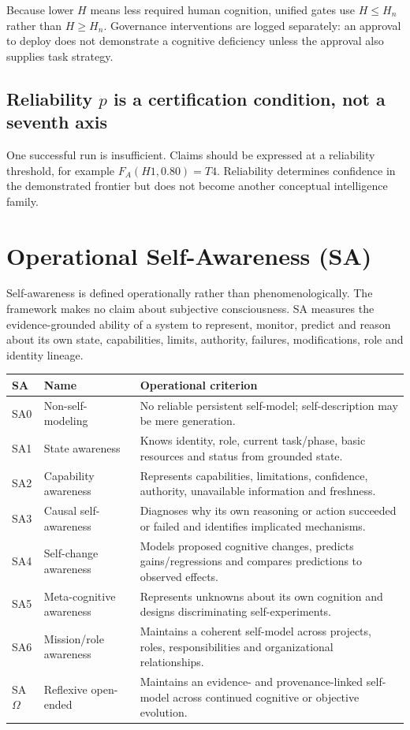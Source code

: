 \documentclass[11pt]{article}
\theoremstyle{definition}
\newcommand{\Om}{\ensuremath{\Omega}}
\begin{document}
Because lower $H$ means less required human cognition, unified gates use $H \le H_n$ rather than $H \ge H_n$. Governance interventions are logged separately: an approval to deploy does not demonstrate a cognitive deficiency unless the approval also supplies task strategy.

\subsection{Reliability $p$ is a certification condition, not a seventh axis}

One successful run is insufficient. Claims should be expressed at a reliability threshold, for example $F_A(H1, 0.80) = T4$. Reliability determines confidence in the demonstrated frontier but does not become another conceptual intelligence family.

\section{Operational Self-Awareness (SA)}

Self-awareness is defined operationally rather than phenomenologically. The framework makes no claim about subjective consciousness. SA measures the evidence-grounded ability of a system to represent, monitor, predict and reason about its own state, capabilities, limits, authority, failures, modifications, role and identity lineage.

\begin{table}[h]
\centering\small
\begin{tabularx}{\textwidth}{@{}llY@{}}
\toprule
SA & Name & Operational criterion \\
\midrule
SA0 & Non-self-modeling & No reliable persistent self-model; self-description may be mere generation. \\
SA1 & State awareness & Knows identity, role, current task/phase, basic resources and status from grounded state. \\
SA2 & Capability awareness & Represents capabilities, limitations, confidence, authority, unavailable information and freshness. \\
SA3 & Causal self-awareness & Diagnoses why its own reasoning or action succeeded or failed and identifies implicated mechanisms. \\
SA4 & Self-change awareness & Models proposed cognitive changes, predicts gains/regressions and compares predictions to observed effects. \\
SA5 & Meta-cognitive awareness & Represents unknowns about its own cognition and designs discriminating self-experiments. \\
SA6 & Mission/role awareness & Maintains a coherent self-model across projects, roles, responsibilities and organizational relationships. \\
SA\Om{} & Reflexive open-ended & Maintains an evidence- and provenance-linked self-model across continued cognitive or objective evolution. \\
\bottomrule
\end{tabularx}
\end{table}
\end{document}
